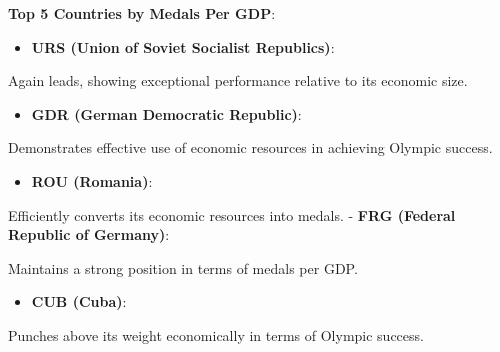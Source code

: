 \documentclass[
  12pt,
]{elsarticle}
\providecommand{\tightlist}{%
  \setlength{\itemsep}{0pt}\setlength{\parskip}{0pt}}
\begin{document}
\textbf{Top 5 Countries by Medals Per GDP}:

\begin{itemize}
\tightlist
\item
  \textbf{URS (Union of Soviet Socialist Republics)}:
\end{itemize}

Again leads, showing exceptional performance relative to its economic
size.

\begin{itemize}
\tightlist
\item
  \textbf{GDR (German Democratic Republic)}:
\end{itemize}

Demonstrates effective use of economic resources in achieving Olympic
success.

\begin{itemize}
\tightlist
\item
  \textbf{ROU (Romania)}:
\end{itemize}

Efficiently converts its economic resources into medals. - \textbf{FRG
(Federal Republic of Germany)}:

Maintains a strong position in terms of medals per GDP.

\begin{itemize}
\tightlist
\item
  \textbf{CUB (Cuba)}:
\end{itemize}

Punches above its weight economically in terms of Olympic success.
\end{document}
